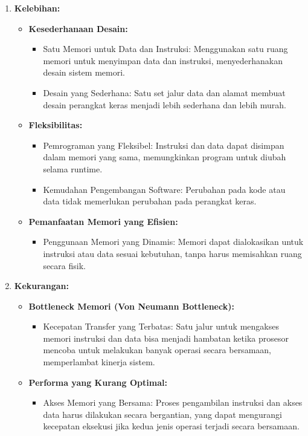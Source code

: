\documentclass{article}
\begin{document}
\begin{enumerate}[label=\arabic*.]
  \item \textbf{Kelebihan:}
  \begin{itemize}
    \item \textbf{Kesederhanaan Desain:}
    \begin{itemize}
      \item Satu Memori untuk Data dan Instruksi: Menggunakan satu ruang memori untuk menyimpan data dan instruksi, menyederhanakan desain sistem memori.
      \item Desain yang Sederhana: Satu set jalur data dan alamat membuat desain perangkat keras menjadi lebih sederhana dan lebih murah.
    \end{itemize}
    
    \item \textbf{Fleksibilitas:}
    \begin{itemize}
      \item Pemrograman yang Fleksibel: Instruksi dan data dapat disimpan dalam memori yang sama, memungkinkan program untuk diubah selama runtime.
      \item Kemudahan Pengembangan Software: Perubahan pada kode atau data tidak memerlukan perubahan pada perangkat keras.
    \end{itemize}
    
    \item \textbf{Pemanfaatan Memori yang Efisien:}
    \begin{itemize}
      \item Penggunaan Memori yang Dinamis: Memori dapat dialokasikan untuk instruksi atau data sesuai kebutuhan, tanpa harus memisahkan ruang secara fisik.
    \end{itemize}
  \end{itemize}
  
  \item \textbf{Kekurangan:}
  \begin{itemize}
    \item \textbf{Bottleneck Memori (Von Neumann Bottleneck):}
    \begin{itemize}
      \item Kecepatan Transfer yang Terbatas: Satu jalur untuk mengakses memori instruksi dan data bisa menjadi hambatan ketika prosesor mencoba untuk melakukan banyak operasi secara bersamaan, memperlambat kinerja sistem.
    \end{itemize}
    
    \item \textbf{Performa yang Kurang Optimal:}
    \begin{itemize}
      \item Akses Memori yang Bersama: Proses pengambilan instruksi dan akses data harus dilakukan secara bergantian, yang dapat mengurangi kecepatan eksekusi jika kedua jenis operasi terjadi secara bersamaan.
    \end{itemize}
    

\end{itemize}
\end{enumerate}
\end{document}
